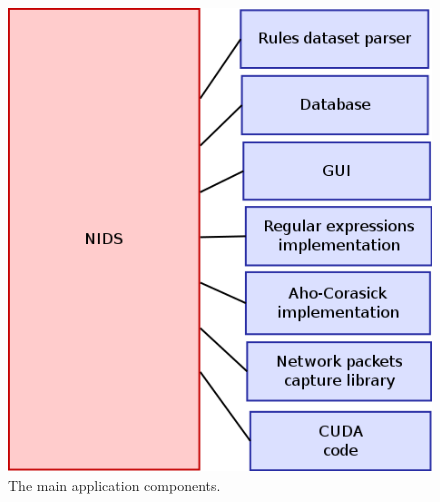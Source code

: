 \documentclass[thesis=M,english]{FITthesis}[2011/07/15]
\begin{document}
\begin{figure}[h]
\centering
\includegraphics[scale=0.5]{images/app_architecture.png}
\caption{The main application components.}
\label{fig:app_architecture}
\end{figure}
\end{document}
